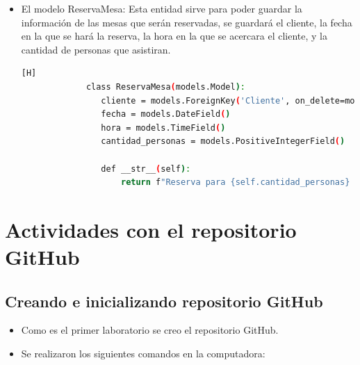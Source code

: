 \documentclass{article}
\begin{document}
\begin{itemize}
\begin{lstlisting}[language=bash,caption={Modelo de carrio}][H]
                def __str__(self):
                    return f"Carrito de {self.cliente.nombre}"
	  \end{lstlisting}
        \item El modelo ReservaMesa: Esta entidad sirve para poder guardar la información de las mesas que serán reservadas, se guardará el cliente, la fecha en la que se hará la reserva, la hora en la que se acercara el cliente, y la cantidad de personas que asistiran.
        \begin{lstlisting}[language=bash,caption={Modelo de ReservaMesa}][H]
		     class ReservaMesa(models.Model):
                cliente = models.ForeignKey('Cliente', on_delete=models.CASCADE)
                fecha = models.DateField()
                hora = models.TimeField()
                cantidad_personas = models.PositiveIntegerField()

                def __str__(self):
                    return f"Reserva para {self.cantidad_personas} personas el {self.fecha} a las {self.hora}"
	  \end{lstlisting}
  
	\end{itemize}
	
	\section{Actividades con el repositorio GitHub}
	
	\subsection{Creando e inicializando repositorio GitHub}
	\begin{itemize}	
		\item Como es el primer laboratorio se creo el repositorio GitHub.
		\item Se realizaron los siguientes comandos en la computadora:
	\end{itemize}	
		
\end{document}
